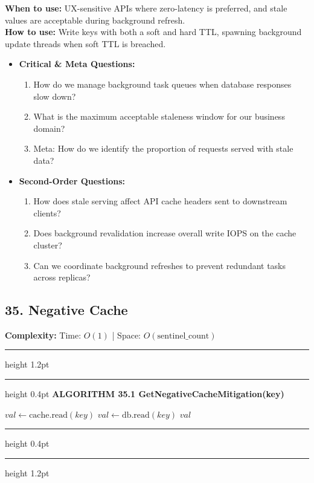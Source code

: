 \documentclass[11pt,a4paper]{article}
\newenvironment{textbookalgo}[2]{%
  \par\addvspace{1.2em}\noindent
  \hrule height 1.2pt
  \vspace{1.5pt}
  \hrule height 0.4pt
  \vspace{5pt}
  {\noindent\large\bfseries\sffamily ALGORITHM #1 \quad #2}
  \par\vspace{5pt}
  \RestyleAlgo{plain}
}{%
  \par\vspace{4pt}
  \hrule height 0.4pt
  \vspace{1.5pt}
  \hrule height 1.2pt
  \par\addvspace{1.2em}
}
\theoremstyle{definition}
\begin{document}
\noindent
\textbf{When to use:} UX-sensitive APIs where zero-latency is preferred, and stale values are acceptable during background refresh.\\
\textbf{How to use:} Write keys with both a soft and hard TTL, spawning background update threads when soft TTL is breached.
\begin{itemize}[leftmargin=*]
  \item[] \textbf{Critical \& Meta Questions:}
  \begin{enumerate}
    \item How do we manage background task queues when database responses slow down?
    \item What is the maximum acceptable staleness window for our business domain?
    \item Meta: How do we identify the proportion of requests served with stale data?
  \end{enumerate}
  \item[] \textbf{Second-Order Questions:}
  \begin{enumerate}
    \item How does stale serving affect API cache headers sent to downstream clients?
    \item Does background revalidation increase overall write IOPS on the cache cluster?
    \item Can we coordinate background refreshes to prevent redundant tasks across replicas?
  \end{enumerate}
\end{itemize}
\medskip


\clearpage
\subsection{35. Negative Cache}

\noindent
\textbf{Complexity:} Time: $O(1)$ | Space: $O(\text{sentinel\_count})$
\smallskip

\begin{textbookalgo}{35.1}{GetNegativeCacheMitigation(key)}
\begin{algorithm}[H]
$val \leftarrow \text{cache.read}(key)$\;
$val \leftarrow \text{db.read}(key)$\;
\Return $val$\;
\end{algorithm}
\end{textbookalgo}
\end{document}
